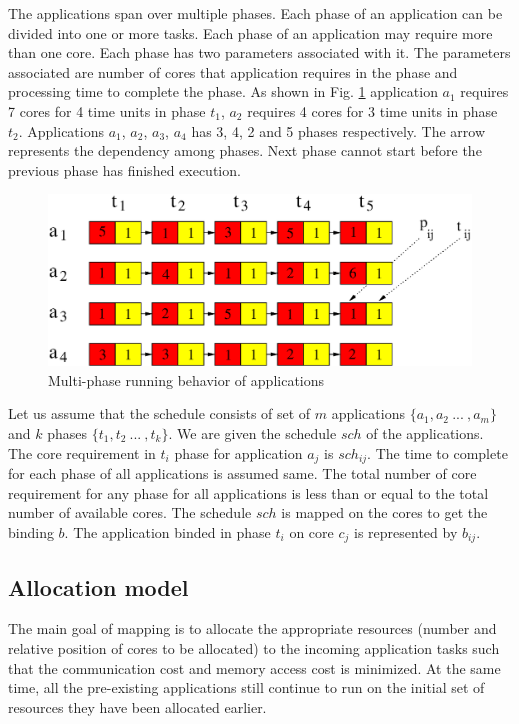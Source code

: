 \documentclass[10pt, conference]{IEEEtran}
\begin{document}
The applications span over multiple phases. Each phase of an application can be divided into one or more tasks. Each phase of an application may require more than one core. Each phase has two parameters associated with it. The parameters associated are number of cores that application requires in the phase and processing time to complete the phase. As shown in Fig. \ref{app_behav} application $a_1$ requires 7 cores for 4 time units in phase $t_1$, $a_2$ requires 4 cores for 3 time units in phase $t_2$. Applications $a_1$, $a_2$, $a_3$, $a_4$ has 3, 4, 2 and 5 phases respectively. The arrow represents the dependency among phases. Next phase cannot start before the previous phase has finished execution.


\begin{figure}[tb]
\centering 
\includegraphics[scale=0.5]{./figure/AppEnv.eps}
\vspace{-0.2cm}\caption{Multi-phase running behavior of applications}
\vspace{-0.3cm}
\label{app_behav}
\end{figure}

  
Let us assume that the schedule consists of set of $m$ applications $\{a_1, a_2\:...\:, a_{m}\}$ and $k$ phases $\{t_1, t_2\:...\:,t_{k}\}$. We are given the schedule $sch$ of the applications. The core requirement in $t_i$ phase for application $a_j$ is $sch_{ij}$. The time to complete for each phase of all applications is assumed same. The total number of core requirement for any phase for all applications is less than or equal to the total number of available cores. The schedule $sch$ is mapped on the cores to get the binding $b$. The application binded in phase $t_i$ on core $c_j$ is represented by $b_{ij}$.


\subsection{Allocation model}

The main goal of mapping is to allocate the appropriate resources (number and relative position of cores to be allocated) to the incoming application tasks such that the communication cost and memory access cost is minimized.  At the same time, all the pre-existing applications still continue to run on the initial set of resources they have been allocated earlier.
\end{document}
